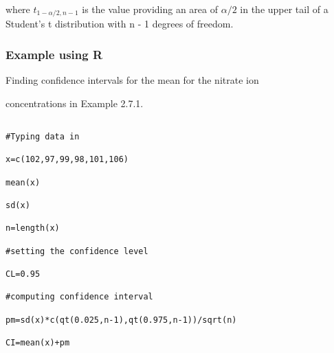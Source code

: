 where $t_{1-\alpha/2,n-1}$ is the value providing an area of $\alpha/2$ in the upper tail of a Student’s t distribution with n - 1 degrees of freedom.

 

\subsubsection{Example using R}

Finding confidence intervals for the mean for the nitrate ion

concentrations in Example 2.7.1.

\begin{verbatim}

#Typing data in

x=c(102,97,99,98,101,106)

mean(x)

sd(x)

n=length(x)

#setting the confidence level

CL=0.95

#computing confidence interval

pm=sd(x)*c(qt(0.025,n-1),qt(0.975,n-1))/sqrt(n)

CI=mean(x)+pm

\end{verbatim}


